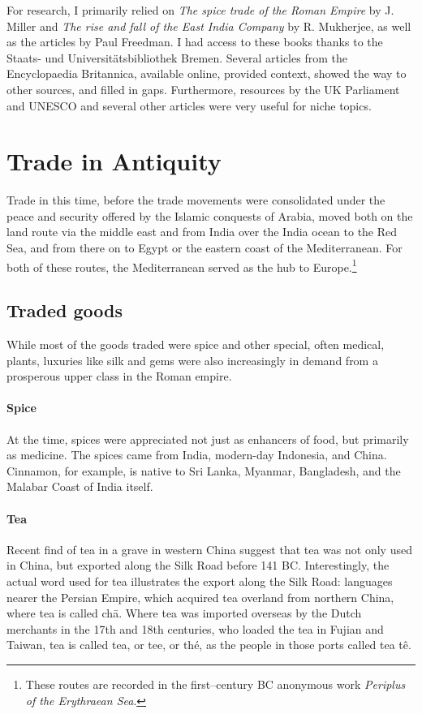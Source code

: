 \documentclass[11pt, a4paper, headings=standardclasses]{scrartcl}
\begin{document}
For research, I primarily relied on \textit{The spice trade of the Roman Empire} by J. Miller and \textit{The rise and fall of the East India Company} by R. Mukherjee, as well as the articles by Paul Freedman. I had access to these books thanks to the Staats- und Universitätsbibliothek Bremen. Several articles from the Encyclopaedia Britannica, available online, provided context, showed the way to other sources, and filled in gaps. Furthermore, resources by the UK Parliament and UNESCO and several other articles were very useful for niche topics.
\section{Trade in Antiquity}
Trade in this time, before the trade movements were consolidated under the peace and security offered by the Islamic conquests of Arabia, moved both on the land route via the middle east and from India over the India ocean to the Red Sea, and from there on to Egypt or the eastern coast of the Mediterranean.\autocite[Chapter 7]{Rome} For both of these routes, the Mediterranean served as the hub to Europe.\footnote{These routes are recorded in the first--century BC anonymous work \emph{Periplus of the Erythraean Sea}.}

\subsection{Traded goods}
While most of the goods traded were spice and other special, often medical, plants, luxuries like silk and gems were also increasingly in demand from a prosperous upper class in the Roman empire.\autocite{RIS}
\paragraph{Spice}
At the time, spices were appreciated not just as enhancers of food, but primarily as medicine\autocite{MST}. The spices came from India, modern-day Indonesia, and China. Cinnamon, for example, is native to Sri Lanka, Myanmar, Bangladesh, and the Malabar Coast of India itself\autocite{Cinnamon}.
\paragraph{Tea}
Recent find of tea in a grave in western China suggest that tea was not only used in China, but exported along the Silk Road before 141 BC.\autocite{npr} Interestingly, the actual word used for tea illustrates the export along the Silk Road: languages nearer the Persian Empire, which acquired tea overland from northern China, where tea is called ch\={a}. Where tea was imported overseas by the Dutch merchants in the 17th and 18th centuries, who loaded the tea in Fujian and Taiwan, tea is called tea, or tee, or th\'{e}, as the people in those ports called tea t\^{e}.
\end{document}
